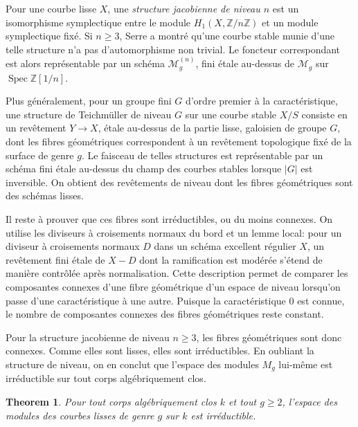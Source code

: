 \documentclass[11pt]{article}
\DeclareMathOperator{\Spec}{Spec}
\theoremstyle{plain}
\newtheorem*{theorem*}{Theorem}
\theoremstyle{definition}
\theoremstyle{remark}
\begin{document}
Pour une courbe lisse \(X\), une \emph{structure jacobienne de niveau \(n\)} est un isomorphisme symplectique entre le module \(H_1(X,\mathbb Z/n\mathbb Z)\) et un module symplectique fixé. Si \(n\geq 3\), Serre a montré qu'une courbe stable munie d'une telle structure n'a pas d'automorphisme non trivial. Le foncteur correspondant est alors représentable par un schéma \(\mathcal M_g^{(n)}\), fini étale au-dessus de \(\mathcal M_g\) sur \(\Spec\mathbb Z[1/n]\).

Plus généralement, pour un groupe fini \(G\) d'ordre premier à la caractéristique, une structure de Teichmüller de niveau \(G\) sur une courbe stable \(X/S\) consiste en un revêtement \(Y\to X\), étale au-dessus de la partie lisse, galoisien de groupe \(G\), dont les fibres géométriques correspondent à un revêtement topologique fixé de la surface de genre \(g\). Le faisceau de telles structures est représentable par un schéma fini étale au-dessus du champ des courbes stables lorsque \(|G|\) est inversible. On obtient des revêtements de niveau dont les fibres géométriques sont des schémas lisses.

Il reste à prouver que ces fibres sont irréductibles, ou du moins connexes. On utilise les diviseurs à croisements normaux du bord et un lemme local: pour un diviseur à croisements normaux \(D\) dans un schéma excellent régulier \(X\), un revêtement fini étale de \(X-D\) dont la ramification est modérée s'étend de manière contrôlée après normalisation. Cette description permet de comparer les composantes connexes d'une fibre géométrique d'un espace de niveau lorsqu'on passe d'une caractéristique à une autre. Puisque la caractéristique \(0\) est connue, le nombre de composantes connexes des fibres géométriques reste constant.

Pour la structure jacobienne de niveau \(n\geq 3\), les fibres géométriques sont donc connexes. Comme elles sont lisses, elles sont irréductibles. En oubliant la structure de niveau, on en conclut que l'espace des modules \(M_g\) lui-même est irréductible sur tout corps algébriquement clos.

\begin{theorem*}
Pour tout corps algébriquement clos \(k\) et tout \(g\geq 2\), l'espace des modules des courbes lisses de genre \(g\) sur \(k\) est irréductible.
\end{theorem*}
\end{document}

